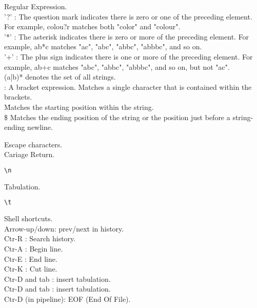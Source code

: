\documentclass{beamer}
\begin{document}
\begin{frame}[fragile]
Regular Expression.\\
'?' : The question mark indicates there is zero or one of the preceding element. For example, colou?r matches both "color" and "colour".\\
'*' : The asterisk indicates there is zero or more of the preceding element. For example, ab*c matches "ac", "abc", "abbc", "abbbc", and so on.\\
'+' : The plus sign indicates there is one or more of the preceding element. For example, ab+c matches "abc", "abbc", "abbbc", and so on, but not "ac".\\
(a|b)* denotes the set of all strings.\\
\[ \] : A bracket expression. Matches a single character that is contained within the brackets.\\
\^ 	Matches the starting position within the string.\\
\$ 	Matches the ending position of the string or the position just before a string-ending newline.
\end{frame}


\begin{frame}[fragile]
Escape characters.\\
Cariage Return.
\begin{lstlisting}[language=bash]
\n
\end{lstlisting}
Tabulation.
\begin{lstlisting}[language=bash]
\t
\end{lstlisting}
\end{frame}


\begin{frame}[fragile]
Shell shortcuts.\\
Arrow-up/down: prev/next in history.\\
Ctr-R : Search history.\\
Ctr-A : Begin line.\\
Ctr-E : End line.\\
Ctr-K : Cut line.\\
Ctr-D and tab : insert tabulation.\\
Ctr-D and tab : insert tabulation.\\
Ctr-D (in pipeline): EOF (End Of File).\\
\end{frame}
\end{document}
